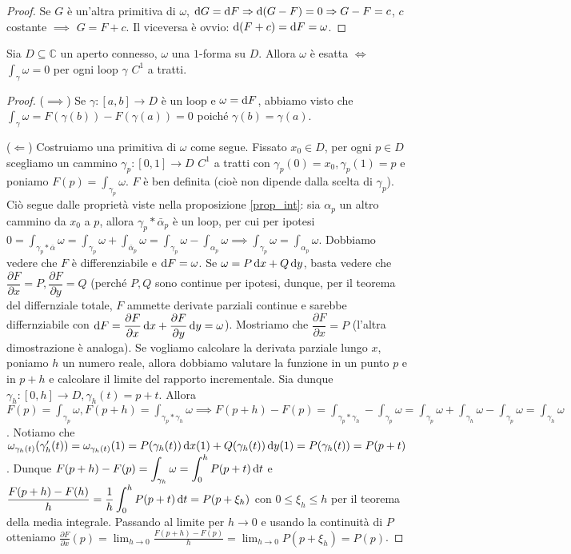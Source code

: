 \begin{proof}
  Se $G$ è un'altra primitiva di $\omega$, $\mathop{}\!\mathrm{d} G=\mathop{}\!\mathrm{d} F \Rightarrow \mathop{}\!\mathrm{d}(G-F)=0 \Rightarrow G-F=c$, $c$ costante $\implies$ $G=F+c$. Il viceversa è ovvio: $\mathop{}\!\mathrm{d}(F+c)=\mathop{}\!\mathrm{d} F=\omega$.
\end{proof}

\begin{thm}
  Sia $D \subseteq \mathbb{C}$ un aperto connesso, $\omega$ una $1$-forma su $D$. Allora $\omega$ è esatta $\iff$ $\displaystyle \int_{\gamma} \omega=0$ per ogni loop $\gamma$ $C^1$ a tratti.
\end{thm}

\begin{proof}
  ($\implies$) Se $\gamma:[a, b] \longrightarrow D$ è un loop e $\omega=\mathop{}\!\mathrm{d} F$, abbiamo visto che $\displaystyle \int_{\gamma} \omega=F(\gamma(b))-F(\gamma(a))=0$ poiché $\gamma(b)=\gamma(a)$.

  ($\Leftarrow$) Costruiamo una primitiva di $\omega$ come segue. Fissato $x_0 \in D$, per ogni $p \in D$ scegliamo un cammino $\gamma_p:[0, 1] \longrightarrow D$ $C^1$ a tratti con $\gamma_p(0)=x_0, \gamma_p(1)=p$ e poniamo $\displaystyle F(p)=\int_{\gamma_p} \omega$. $F$ è ben definita (cioè non dipende dalla scelta di $\gamma_p$).
  Ciò segue dalle proprietà viste nella proposizione \ref{prop_int}: sia $\alpha_p$ un altro cammino da $x_0$ a $p$, allora $\gamma_p*\bar{\alpha}_p$ è un loop, per cui per ipotesi $\displaystyle 0=\int_{\gamma_p*\bar{\alpha}} \omega=\int_{\gamma_p} \omega+\int_{\bar{\alpha}_p} \omega=\int_{\gamma_p} \omega-\int_{\alpha_p} \omega \implies \int_{\gamma_p} \omega=\int_{\alpha_p} \omega$.
  Dobbiamo vedere che $F$ è differenziabile e $\mathop{}\!\mathrm{d} F=\omega$. Se $\omega=P\mathop{}\!\mathrm{d} x+Q\mathop{}\!\mathrm{d} y$, basta vedere che $\dfrac{\partial F}{\partial x}=P, \dfrac{\partial F}{\partial y}=Q$ (perché $P, Q$ sono continue per ipotesi, dunque, per il teorema del differnziale totale, $F$ ammette derivate parziali continue e sarebbe differnziabile con $\mathop{}\!\mathrm{d} F=\dfrac{\partial F}{\partial x}\mathop{}\!\mathrm{d} x+\dfrac{\partial F}{\partial y}\mathop{}\!\mathrm{d} y=\omega$).
  Mostriamo che $\dfrac{\partial F}{\partial x}=P$ (l'altra dimostrazione è analoga). Se vogliamo calcolare la derivata parziale lungo $x$, poniamo $h$ un numero reale, allora dobbiamo valutare la funzione in un punto $p$ e in $p+h$ e calcolare il limite del rapporto incrementale. Sia dunque $\gamma_h:[0, h] \longrightarrow D, \gamma_h(t)=p+t$.
  Allora $\displaystyle F(p)=\int_{\gamma_p} \omega, F(p+h)=\int_{\gamma_p*\gamma_h} \omega \implies F(p+h)-F(p)=\int_{\gamma_p*\gamma_h}-\int_{\gamma_p} \omega=\int_{\gamma_p} \omega+\int_{\gamma_h} \omega-\int_{\gamma_p} \omega=\int_{\gamma_h} \omega$.
  Notiamo che $\omega_{\gamma_h(t)}(\gamma_h'(t))=\omega_{\gamma_h(t)}(1)=P(\gamma_h(t))\mathop{}\!\mathrm{d} x(1)+Q(\gamma_h(t)) \mathop{}\!\mathrm{d} y(1)=P(\gamma_h(t))=P(p+t)$.
  Dunque $\displaystyle F(p+h)-F(p)=\int_{\gamma_h} \omega=\int_0^h P(p+t)\mathop{}\!\mathrm{d} t$ e $\displaystyle \frac{F(p+h)-F(h)}{h}=\frac{1}{h}\int_0^h P(p+t)\mathop{}\!\mathrm{d} t=P(p+\xi_h)$ con $0 \le \xi_h \le h$ per il teorema della media integrale.
  Passando al limite per $h \longrightarrow 0$ e usando la continuità di $P$ otteniamo $\displaystyle \frac{\partial F}{\partial x}(p)=\lim_{h \longrightarrow 0} \frac{F(p+h)-F(p)}{h}=\lim_{h \longrightarrow 0} P(p+\xi_h)=P(p)$.
\end{proof}
